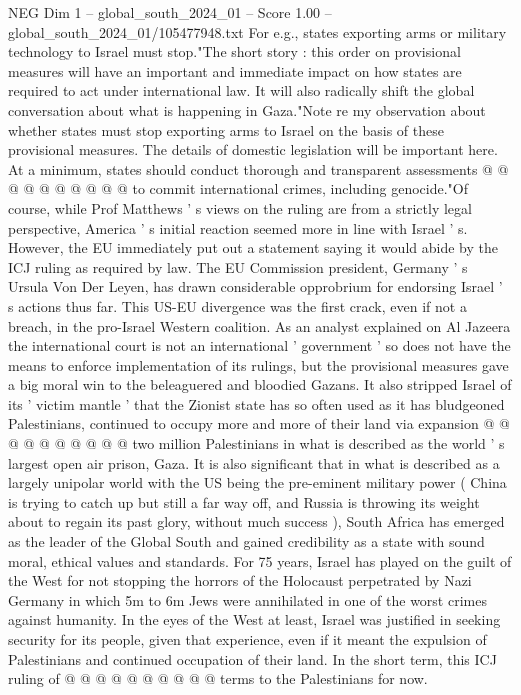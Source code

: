 \begin{textsample}{NEG Dim 1 – global\_south\_2024\_01 – Score 1.00 – global\_south\_2024\_01/105477948.txt}
For e.g., states exporting arms or military technology to Israel must stop."The short story : this order on provisional measures will have an important and immediate impact on how states are required to act under international law.
It will also radically shift the global conversation about what is happening in Gaza."Note re my observation about whether states must stop exporting arms to Israel on the basis of these provisional measures.
The details of domestic legislation will be important here.
At a minimum, states should conduct thorough and transparent assessments @ @ @ @ @ @ @ @ @ @ to commit international crimes, including genocide."Of course, while Prof Matthews ' s views on the ruling are from a strictly legal perspective, America ' s initial reaction seemed more in line with Israel ' s.
However, the EU immediately put out a statement saying it would abide by the ICJ ruling as required by law.
The EU Commission president, Germany ' s Ursula Von Der Leyen, has drawn considerable opprobrium for endorsing Israel ' s actions thus far.
This US-EU divergence was the first crack, even if not a breach, in the pro-Israel Western coalition.
As an analyst explained on Al Jazeera the international court is not an international ' government ' so does not have the means to enforce implementation of its rulings, but the provisional measures gave a big moral win to the beleaguered and bloodied Gazans.
It also stripped Israel of its ' victim mantle ' that the Zionist state has so often used as it has bludgeoned Palestinians, continued to occupy more and more of their land via expansion @ @ @ @ @ @ @ @ @ @ two million Palestinians in what is described as the world ' s largest open air prison, Gaza.
It is also significant that in what is described as a largely unipolar world with the US being the pre-eminent military power ( China is trying to catch up but still a far way off, and Russia is throwing its weight about to regain its past glory, without much success ), South Africa has emerged as the leader of the Global South and gained credibility as a state with sound moral, ethical values and standards.
For 75 years, Israel has played on the guilt of the West for not stopping the horrors of the Holocaust perpetrated by Nazi Germany in which 5m to 6m Jews were annihilated in one of the worst crimes against humanity.
In the eyes of the West at least, Israel was justified in seeking security for its people, given that experience, even if it meant the expulsion of Palestinians and continued occupation of their land.
In the short term, this ICJ ruling of @ @ @ @ @ @ @ @ @ @ terms to the Palestinians for now.

\end{textsample}
